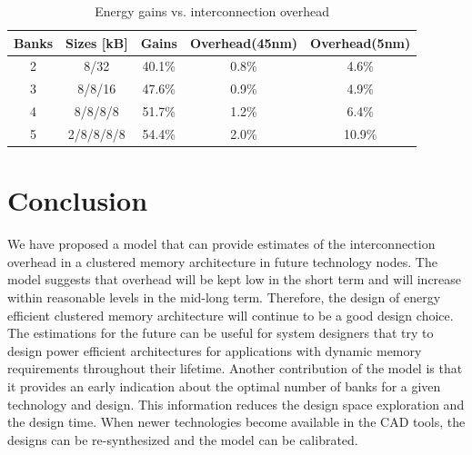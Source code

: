 \begin{center}
	\begin{table}
	\centering
	\caption{Energy gains vs. interconnection overhead}
	\label{tab:GainvsOverhead}
	{
	\begin{tabular}{|c|c|c|c|c|}
	\hline
	Banks & Sizes [kB] & Gains & Overhead(45nm) & Overhead(5nm) \\
	\hline
	2 & 8/32 & 40.1\%   & 0.8\%  & 4.6\%  \\
	\hline 
	3 & 8/8/16 & 47.6\%   & 0.9\%  & 4.9\% \\
	\hline 
	4 & 8/8/8/8 & 51.7\% & 1.2\% & 6.4\% \\
	\hline
	5 & 2/8/8/8/8 & 54.4\% & 2.0\% & 10.9\% \\
	\hline	
	\end{tabular}}
	\end{table}
\end{center}
  
\section{Conclusion}
\label{conclusionE}

We have proposed a model that can provide estimates of the interconnection overhead in a clustered memory architecture in future technology nodes.
The model suggests that overhead will be kept low in the short term and will increase within reasonable levels in the mid-long term.
Therefore, the design of energy efficient clustered memory architecture will continue to be a good design choice.
The estimations for the future can be useful for system designers that try to design power efficient architectures for applications with dynamic memory requirements throughout their lifetime.
Another contribution of the model is that it provides an early indication about the optimal number of banks for a given technology and design.
This information reduces the design space exploration and the design time. 
When newer technologies become available in the CAD tools, the designs can be re-synthesized and the model can be calibrated.

%
%

%
